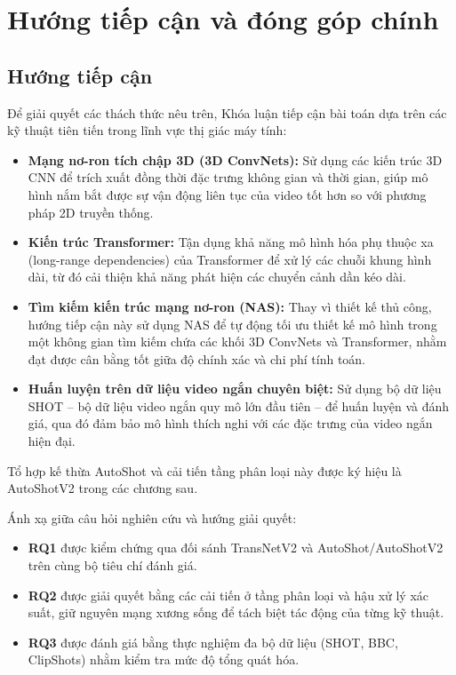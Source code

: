 \section{Hướng tiếp cận và đóng góp chính}
\label{sec:approach_contribution}

\subsection{Hướng tiếp cận}
Để giải quyết các thách thức nêu trên, Khóa luận tiếp cận bài toán dựa trên các kỹ thuật tiên tiến trong lĩnh vực thị giác máy tính:
\begin{itemize}
    \item \textbf{Mạng nơ-ron tích chập 3D (3D ConvNets):} Sử dụng các kiến trúc 3D CNN để trích xuất đồng thời đặc trưng không gian và thời gian, giúp mô hình nắm bắt được sự vận động liên tục của video tốt hơn so với phương pháp 2D truyền thống.
    \item \textbf{Kiến trúc Transformer:} Tận dụng khả năng mô hình hóa phụ thuộc xa (long-range dependencies) của Transformer để xử lý các chuỗi khung hình dài, từ đó cải thiện khả năng phát hiện các chuyển cảnh dần kéo dài.
    \item \textbf{Tìm kiếm kiến trúc mạng nơ-ron (NAS):} Thay vì thiết kế thủ công, hướng tiếp cận này sử dụng NAS để tự động tối ưu thiết kế mô hình trong một không gian tìm kiếm chứa các khối 3D ConvNets và Transformer, nhằm đạt được cân bằng tốt giữa độ chính xác và chi phí tính toán.
    \item \textbf{Huấn luyện trên dữ liệu video ngắn chuyên biệt:} Sử dụng bộ dữ liệu SHOT \cite{zhu2023autoshot} -- bộ dữ liệu video ngắn quy mô lớn đầu tiên -- để huấn luyện và đánh giá, qua đó đảm bảo mô hình thích nghi với các đặc trưng của video ngắn hiện đại.
\end{itemize}

\noindent
Tổ hợp kế thừa AutoShot và cải tiến tầng phân loại này được ký hiệu là AutoShotV2 trong các chương sau.

\noindent
Ánh xạ giữa câu hỏi nghiên cứu và hướng giải quyết:
\begin{itemize}
    \item \textbf{RQ1} được kiểm chứng qua đối sánh TransNetV2 và AutoShot/AutoShotV2 trên cùng bộ tiêu chí đánh giá.
    \item \textbf{RQ2} được giải quyết bằng các cải tiến ở tầng phân loại và hậu xử lý xác suất, giữ nguyên mạng xương sống để tách biệt tác động của từng kỹ thuật.
    \item \textbf{RQ3} được đánh giá bằng thực nghiệm đa bộ dữ liệu (SHOT, BBC, ClipShots) nhằm kiểm tra mức độ tổng quát hóa.
\end{itemize}

